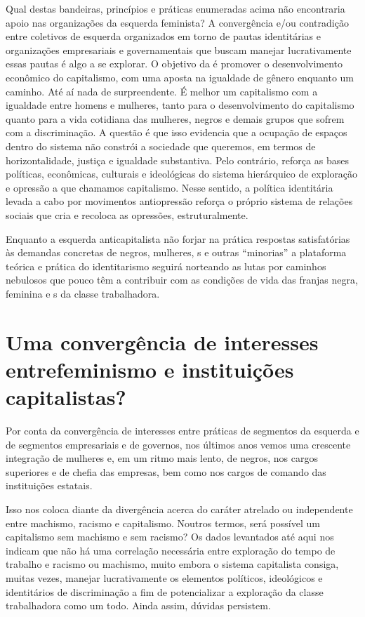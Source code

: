 Qual destas bandeiras, princípios e práticas enumeradas acima não
encontraria apoio nas organizações da esquerda feminista? A convergência
e/ou contradição entre coletivos de esquerda organizados em torno de
pautas identitárias e organizações empresariais e governamentais que
buscam manejar lucrativamente essas pautas é algo a se explorar. O
objetivo da  é promover o desenvolvimento econômico do capitalismo,
com uma aposta na igualdade de gênero enquanto um caminho. Até aí nada
de surpreendente. É melhor um capitalismo com a igualdade entre homens e
mulheres, tanto para o desenvolvimento do capitalismo quanto para a vida
cotidiana das mulheres, negros e demais grupos que sofrem com a
discriminação. A questão é que isso evidencia que a ocupação de espaços
dentro do sistema não constrói a sociedade que queremos, em termos de
horizontalidade, justiça e igualdade substantiva. Pelo contrário,
reforça as bases políticas, econômicas, culturais e ideológicas do
sistema hierárquico de exploração e opressão a que chamamos capitalismo.
Nesse sentido, a política identitária levada a cabo por movimentos
antiopressão reforça o próprio sistema de relações sociais que cria e
recoloca as opressões, estruturalmente.


Enquanto a esquerda anticapitalista não forjar na prática respostas
satisfatórias às demandas concretas de negros, mulheres, s e outras
``minorias'' a plataforma teórica e prática do identitarismo seguirá
norteando as lutas por caminhos nebulosos que pouco têm a contribuir com
as condições de vida das franjas negra, feminina e s da classe
trabalhadora.

\chapter[Uma convergência de interesses entre feminismo e\\ instituições capitalistas?]{Uma convergência de interesses entre\break feminismo e instituições capitalistas?}

Por conta da convergência de interesses entre práticas de segmentos da
esquerda e de segmentos empresariais e de governos, nos últimos anos
vemos uma crescente integração de mulheres e, em um ritmo mais lento, de
negros, nos cargos superiores e de chefia das empresas, bem como nos
cargos de comando das instituições estatais.

Isso nos coloca diante da divergência acerca do caráter atrelado ou
independente entre machismo, racismo e capitalismo. Noutros termos, será
possível um capitalismo sem machismo e sem racismo? Os dados levantados
até aqui nos indicam que não há uma correlação necessária entre
exploração do tempo de trabalho e racismo ou machismo, muito embora o
sistema capitalista consiga, muitas vezes, manejar lucrativamente os
elementos políticos, ideológicos e identitários de discriminação a fim
de potencializar a exploração da classe trabalhadora como um todo. Ainda
assim, dúvidas persistem.

